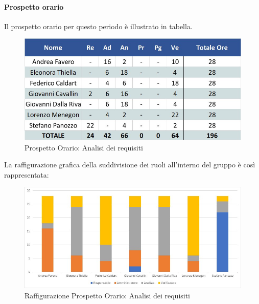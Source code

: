 \paragraph{Prospetto orario}
Il prospetto orario per questo periodo è illustrato in tabella.
\begin{figure}[H]
	\centerline{\includegraphics[scale=0.7]{img/Preventivo/AnalisiRequisitiOrario.jpg}}
	\caption{Prospetto Orario: Analisi dei requisiti}
	\clearpage
\end{figure}
La raffigurazione grafica della suddivisione dei ruoli all'interno del gruppo è così rappresentata: 
\begin{figure}[H]
	\centerline{\includegraphics[scale=0.85]{img/Preventivo/Istogrammi/AnalisiRequisiti.jpg}}
	\caption{Raffigurazione Prospetto Orario: Analisi dei requisiti}
	\clearpage
\end{figure}
\newpage
